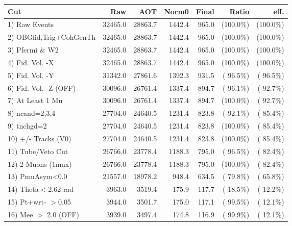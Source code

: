  \begin{table}[h!]\centering
 \begin{tabular}{||l||r|r|r|r|r|r||}
 \hline
 \hline
 Cut & Raw & AOT & Norm0 & Final & Ratio & eff.       \\
 \hline
  1) Raw Events           &      32465.0 &      28863.7 &       1442.4 &        965.0 & (100.0\%) & (100.0\%) \\
  2) OBGfid,Trig+CohGenTh &      32465.0 &      28863.7 &       1442.4 &        965.0 & (100.0\%) & (100.0\%) \\
  3) Pfermi \& W2         &      32465.0 &      28863.7 &       1442.4 &        965.0 & (100.0\%) & (100.0\%) \\
  4) Fid. Vol. -X         &      32465.0 &      28863.7 &       1442.4 &        965.0 & (100.0\%) & (100.0\%) \\
  5) Fid. Vol. -Y         &      31342.0 &      27861.6 &       1392.3 &        931.5 & ( 96.5\%) & ( 96.5\%) \\
  6) Fid. Vol. -Z (OFF)   &      30096.0 &      26761.4 &       1337.4 &        894.7 & ( 96.1\%) & ( 92.7\%) \\
  7) At Least 1 Mu        &      30096.0 &      26761.4 &       1337.4 &        894.7 & (100.0\%) & ( 92.7\%) \\
  8) ncand=2,3,4          &      27704.0 &      24640.5 &       1231.4 &        823.8 & ( 92.1\%) & ( 85.4\%) \\
  9) tnchgd=2             &      27704.0 &      24640.5 &       1231.4 &        823.8 & (100.0\%) & ( 85.4\%) \\
 10) +/- Tracks (V0)      &      27704.0 &      24640.5 &       1231.4 &        823.8 & (100.0\%) & ( 85.4\%) \\
 11) Tube/Veto Cut        &      26766.0 &      23778.4 &       1188.3 &        795.0 & ( 96.5\%) & ( 82.4\%) \\
 12) 2 Muons (1mux)       &      26766.0 &      23778.4 &       1188.3 &        795.0 & (100.0\%) & ( 82.4\%) \\
 13) PmuAsym<0.0          &      21557.0 &      18978.2 &        948.4 &        634.5 & ( 79.8\%) & ( 65.8\%) \\
 14) Theta$<$2.62 rad     &       3963.0 &       3519.4 &        175.9 &        117.7 & ( 18.5\%) & ( 12.2\%) \\
 15) Pt+wrt- $>$0.05      &       3944.0 &       3501.7 &        175.0 &        117.1 & ( 99.5\%) & ( 12.1\%) \\
 16) Mee $>$ 2.0  (OFF)   &       3939.0 &       3497.4 &        174.8 &        116.9 & ( 99.9\%) & ( 12.1\%) \\

\end{tabular}
\end{table}
